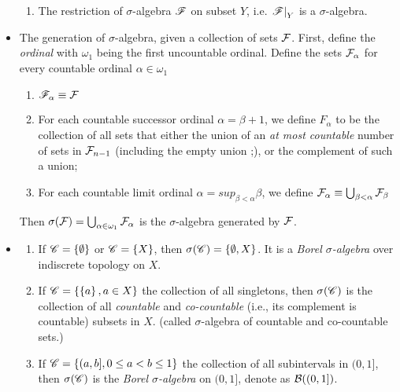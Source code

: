 \documentclass[11pt]{article}
\begin{document}
\begin{itemize}
\begin{example}
\begin{enumerate}
\item The restriction of $\sigma$-algebra ${\mathscr F}$ on subset $Y$, i.e. $\left.{{\mathscr F}}\right\vert_{Y}$ is a $\sigma$-algebra.
\end{enumerate}
\end{example}


\item \begin{example} \citep{tao2011introduction} The generation of $\sigma$-algebra, given a collection of sets ${\mathcal F}$. First, define the \emph{ordinal} with $\omega_{1}$ being the first uncountable ordinal. Define the sets ${\mathcal F}_{\alpha}$ for every countable ordinal $\alpha \in \omega_{1}$
\begin{enumerate}
\item ${\mathscr F}_{\alpha}\equiv {\mathcal F}$
\item For each countable successor ordinal $\alpha = \beta + 1$, we define $F_{\alpha}$ to be the collection of all sets that either the union of an \emph{at most countable} number of sets in ${\mathcal F}_{n-1}$ (including the empty union ;), or the complement of such a union;
\item For each countable limit ordinal $\alpha = sup_{\beta<\alpha}\beta$, we define ${\mathcal F}_{\alpha} \equiv \bigcup_{\beta<\alpha}{\mathcal F}_{\beta}$
\end{enumerate}
Then $\sigma({\mathcal F}) = \bigcup_{\alpha\in \omega_{1}}{\mathcal F}_{\alpha}$ is the $\sigma$-algebra generated by ${\mathcal F}$.
\end{example}

\item \begin{example}
\begin{enumerate}
\item If ${\mathscr C} = \left\{\emptyset\right\}$ or ${\mathscr C} = \left\{X\right\}$, then $\sigma({\mathscr C}) = \left\{\emptyset , X\right\}$. It is a \emph{Borel $\sigma$-algebra} over indiscrete topology on $X$.

\item If ${\mathscr C} = \left\{\left\{a\right\}, a\in X\right\}$ the collection of all singletons, then $\sigma({\mathscr C})$ is the collection of all \emph{countable} and \emph{co-countable} (i.e., its complement is countable) subsets in $X$. (called $\sigma$-algebra of countable and co-countable sets.) 

\item If ${\mathscr C} = \left\{(a,b], 0\le a<b\le 1\right\}$ the collection of all subintervals in $(0,1]$, then $\sigma({\mathscr C})$ is the \emph{Borel $\sigma$-algebra} on $(0,1]$, denote as ${\mathcal B}((0,1])$. 
\end{enumerate}
\end{example}



\end{itemize}
\end{document}
